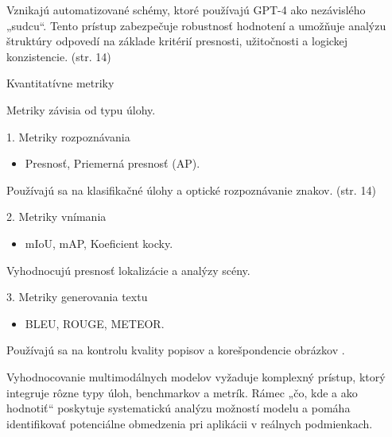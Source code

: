 \documentclass[]{tukediphc}
\begin{document}
Vznikajú automatizované schémy, ktoré používajú GPT-4 ako nezávislého „sudcu“. Tento prístup zabezpečuje robustnosť hodnotení a umožňuje analýzu štruktúry odpovedí na základe kritérií presnosti, užitočnosti a logickej konzistencie. (str. 14)

Kvantitatívne metriky

Metriky závisia od typu úlohy.

1. Metriky rozpoznávania
\begin{itemize}
\item Presnosť, Priemerná presnosť (AP).
\end{itemize}

Používajú sa na klasifikačné úlohy a optické rozpoznávanie znakov. (str. 14)

2. Metriky vnímania

\begin{itemize}
\item mIoU, mAP, Koeficient kocky.
\end{itemize}

Vyhodnocujú presnosť lokalizácie a analýzy scény.

3. Metriky generovania textu

\begin{itemize}
\item BLEU, ROUGE, METEOR.
\end{itemize}

Používajú sa na kontrolu kvality popisov a korešpondencie obrázkov \cite{researchgate:A_Survey_on_Evaluation_of_Multimodal_Large_Language_Models}.

Vyhodnocovanie multimodálnych modelov vyžaduje komplexný prístup, ktorý integruje rôzne typy úloh, benchmarkov a metrík. Rámec „čo, kde a ako hodnotiť“ poskytuje systematickú analýzu možností modelu a pomáha identifikovať potenciálne obmedzenia pri aplikácii v reálnych podmienkach.


\end{document}
